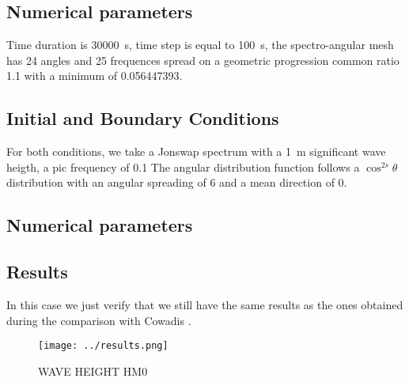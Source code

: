 %
\subsection{Numerical parameters}
%
Time duration is 30000~s, time step is equal to 100~s, the spectro-angular mesh has 24 angles and 25 frequences spread on a geometric progression common ratio 1.1 with a minimum of 0.056447393.

\subsection{Initial and Boundary Conditions}
%
For both conditions, we take a Jonswap spectrum with a 1~m significant wave heigth, a pic frequency of 0.1 The angular distribution function follows a $\cos^{2s} \theta$ distribution with an angular spreading of 6 and a mean direction of 0.

\subsection{Numerical parameters}


%
%
\subsection{Results}
In this case we just verify that we still have the same results as the ones obtained during the comparison with Cowadis \cite{cowadis}.
\begin{figure} [!h]
\centering
\texttt{[image: ../results.png]}
 \caption{WAVE HEIGHT HM0}\label{resultsbf}
\end{figure}
